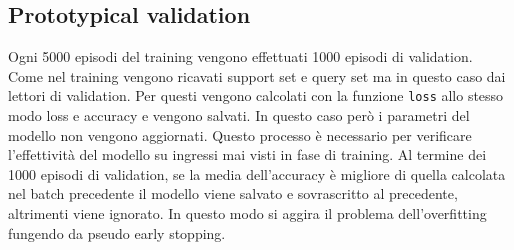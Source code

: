 \documentclass[12pt,a4paper,titlepage]{article}
\begin{document}
\subsection{Prototypical validation}
Ogni 5000 episodi del training vengono effettuati 1000 episodi di validation.
Come nel training vengono ricavati support set e query set ma in questo caso dai lettori di validation.
Per questi vengono calcolati con la funzione \texttt{loss} allo stesso modo loss e accuracy e vengono salvati.
In questo caso però i parametri del modello non vengono aggiornati.
Questo processo è necessario per verificare l'effettività del modello su ingressi mai visti in fase di training.
Al termine dei 1000 episodi di validation, se la media dell'accuracy è migliore di quella calcolata nel batch precedente il modello viene salvato e sovrascritto al precedente, altrimenti viene ignorato.
In questo modo si aggira il problema dell'overfitting fungendo da pseudo early stopping. 
\end{document}
